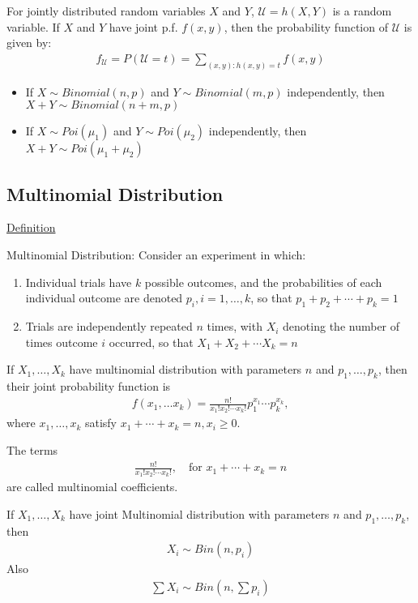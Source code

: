 \documentclass{article}
\begin{document}
For jointly distributed random variables $X$ and $Y$, $\mathcal{U} = h(X,Y)$ is a random variable. If $X$ and $Y$ have joint p.f. $f(x,y)$, then the probability function of $\mathcal{U}$ is given by:
\begin{align*}
    f_{\mathcal{U}} = P(\mathcal{U} = t) = \sum_{(x,y):h(x,y) = t}f(x,y)
\end{align*}

\begin{itemize}
    \item If $X \sim Binomial(n,p)$ and $Y \sim Binomial(m,p)$ independently, then $X + Y \sim Binomial(n+m,p)$
    \item If $X \sim Poi(\mu_1)$ and $Y \sim Poi(\mu_2)$ independently, then $X + Y \sim Poi(\mu_1 + \mu_2)$
\end{itemize}

\subsection{Multinomial Distribution}

\underline{Definition}

Multinomial Distribution: Consider an experiment in which:
\begin{enumerate}
    \item Individual trials have $k$ possible outcomes, and the probabilities of each individual outcome are denoted $p_i, i = 1, \ldots, k$, so that $p_1 + p_2 + \cdots + p_k = 1$
    \item Trials are independently repeated $n$ times, with $X_i$ denoting the number of times outcome $i$ occurred, so that $X_1 + X_2 + \cdots X_k = n$
\end{enumerate}

If $X_1, \ldots, X_k$ have multinomial distribution with parameters $n$ and $p_1, \ldots, p_k$, then their joint probability function is
\begin{align*}
    f(x_1, \ldots x_k) = \frac{n!}{x_1!x_2!\cdots x_k!}p_1^{x_1}\cdots p_k^{x_k},
\end{align*}
where $x_1, \ldots, x_k$ satisfy $x_1 + \cdots + x_k = n, x_i \ge 0$. 

The terms 
\begin{align*}
    \frac{n!}{x_1!x_2!\cdots x_k!}, \quad \text{for } x_1 + \cdots + x_k = n
\end{align*}
are called multinomial coefficients. 

If $X_1, \ldots, X_k$ have joint Multinomial distribution with parameters $n$ and $p_1, \ldots, p_k$, then
\begin{align*}
    X_i \sim Bin(n,p_i)
\end{align*}
Also
\begin{align*}
    \sum X_i \sim Bin\left ( n, \sum p_i \right )
\end{align*}
\end{document}
